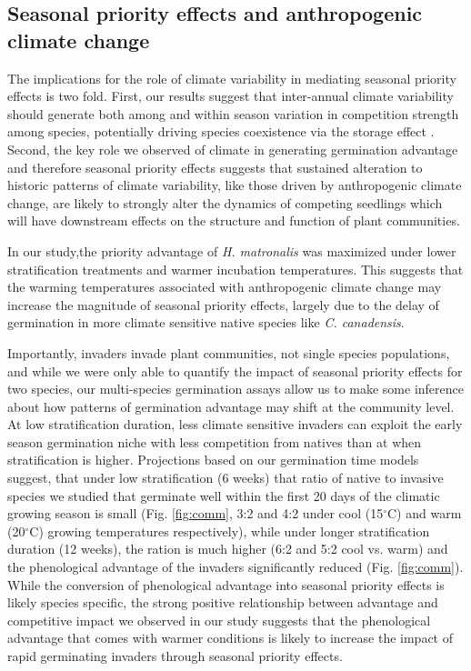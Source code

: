 \documentclass{article}[11pt]
\begin{document}
\subsection*{Seasonal priority effects and anthropogenic climate change}
The implications for the role of climate variability in mediating seasonal priority effects is two fold. First, our results suggest that inter-annual climate variability should generate both among and within season variation in competition strength among species, potentially driving species coexistence via the storage effect \citep{}. Second, the key role we observed of climate in generating germination advantage and therefore seasonal priority effects suggests that sustained alteration to historic patterns of climate variability, like those driven by anthropogenic climate change, are likely to strongly alter the dynamics of competing seedlings which will have downstream effects on the structure and function of plant communities.

In our study,the priority advantage of \textit{H. matronalis} was maximized under lower stratification treatments and warmer incubation temperatures. This suggests that the warming temperatures associated with anthropogenic climate change may increase the magnitude of seasonal priority effects, largely due to the delay of germination in more climate sensitive native species like \textit{C. canadensis}.

Importantly, invaders invade plant communities, not single species populations, and while we were only able to quantify the impact of seasonal priority effects for two species, our multi-species germination assays allow us to make some inference about how patterns of germination advantage may shift at the community level. At low stratification duration, less climate sensitive invaders can exploit the early season germination niche with less competition from natives than at when stratification is higher. Projections based on our germination time models suggest, that under low stratification (6 weeks) that ratio of native to invasive species we studied that germinate well within the first 20 days of the climatic growing season is small (Fig. \ref{fig:comm}, 3:2 and 4:2 under cool (15$^{\circ}$C) and warm (20$^{\circ}$C) growing temperatures respectively), while under longer stratification duration (12 weeks), the ration is much higher (6:2 and 5:2 cool vs. warm) and the phenological advantage of the invaders significantly reduced (Fig. \ref{fig:comm}). While the conversion of phenological advantage into seasonal priority effects is likely species specific, the strong positive relationship between advantage and competitive impact we observed in our study suggests that the phenological advantage that comes with warmer conditions is likely to increase the impact of rapid germinating invaders through seasonal priority effects. 
\end{document}
